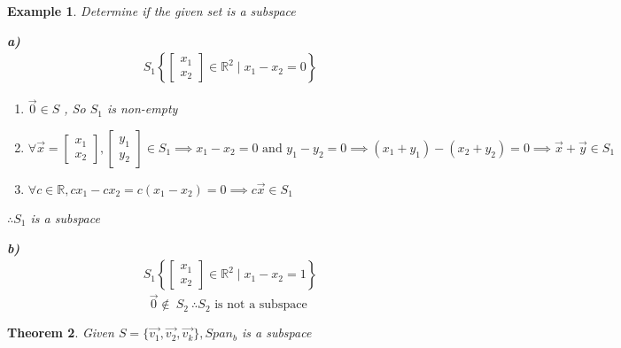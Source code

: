 \documentclass{article}
\newcounter{lecnum}
\newtheorem{theorem}{Theorem}[lecnum]
\newtheorem{ex}[theorem]{Example}
\begin{document}
\begin{ex} Determine if the given set is a subspace \\
\begin{minipage}{.5\textwidth} %
\textbf{a)}
\[\begin{aligned} S_1 \left\{ \begin{bmatrix} x_1 \\ x_2 \end{bmatrix} \in \mathbb{R}^2 \mid x_1 - x_2 = 0 \right\} \end{aligned} \] 
\begin{enumerate}
\item \( \vec{0} \in S \)  , So \( S_1\) is non-empty
\item \( \forall \vec{x} = \begin{bmatrix} x_1 \\ x_2 \end{bmatrix} , \begin{bmatrix} y_1 \\ y_2 \end{bmatrix} \in S_1 \implies x_1 - x_2 = 0  \text{ and } y_1 - y_2 = 0 \implies (x_1 + y_1) - (x_2 + y_2) = 0 \implies \vec{x} + \vec{y} \in S_1 \)
\item \(\forall c \in \mathbb{R} , cx_1 - cx_2  = c(x_1 - x_2) = 0 \implies c\vec{x} \in S_1\)
\end{enumerate}
\( \therefore S_1\) is a subspace 
\end{minipage} %
\begin{minipage}{.5\textwidth} %
\textbf{b)}
\[\begin{aligned} S_1 \left\{ \begin{bmatrix} x_1 \\ x_2 \end{bmatrix} \in \mathbb{R}^2 \mid x_1 - x_2 = 1 \right\} \end{aligned} \] 
\[\vec{0} \notin \ S_2 \ \therefore S_2 \text{ is not a subspace } \]
\end{minipage}
\end{ex}

\begin{theorem}
Given \( S = \{ \vec{v_1} , \vec{v_2} , \vec{v_k} \} ,  Span_b  \) is a subspace  
\end{theorem}
\end{document}
